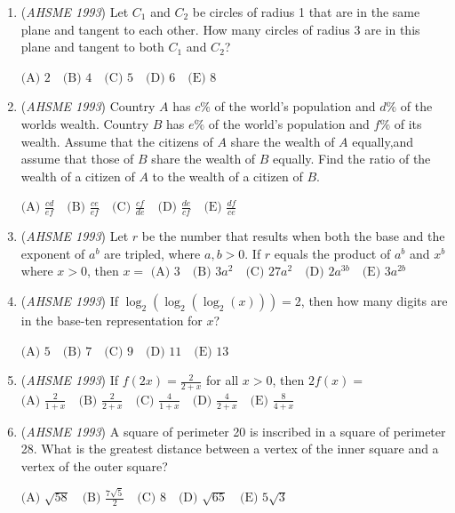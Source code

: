 \begin{enumerate}
 $\text{(A) } 10\quad \text{(B) } 11\quad \text{(C) } 12\quad \text{(D) } 13\quad \text{(E) } 15$


	\item (\textit{AHSME 1993}) Let $C_1$ and $C_2$ be circles of radius 1 that are in the same plane and tangent to each other. How many circles of radius 3 are in this plane and tangent to both $C_1$ and $C_2$?


 $\text{(A) } 2\quad \text{(B) } 4\quad \text{(C) } 5\quad \text{(D) } 6\quad \text{(E) } 8$


	\item (\textit{AHSME 1993}) Country $A$ has $c\%$ of the world's population and $d\%$ of the worlds wealth. Country $B$ has $e\%$ of the world's population and $f\%$ of its wealth. Assume that the citizens of $A$ share the wealth of $A$ equally,and assume that those of $B$ share the wealth of $B$ equally. Find the ratio of the wealth of a citizen of $A$ to the wealth of a citizen of $B$.


 $\text{(A) } \frac{cd}{ef}\quad \text{(B) } \frac{ce}{ef}\quad \text{(C) } \frac{cf}{de}\quad \text{(D) } \frac{de}{cf}\quad \text{(E) } \frac{df}{ce}$


	\item (\textit{AHSME 1993}) Let $r$ be the number that results when both the base and the exponent of $a^b$ are tripled, where $a,b>0$. If $r$ equals the product of $a^b$ and $x^b$ where $x>0$, then $x=$
$\text{(A) } 3\quad \text{(B) } 3a^2\quad \text{(C) } 27a^2\quad \text{(D) } 2a^{3b}\quad \text{(E) } 3a^{2b}$


	\item (\textit{AHSME 1993}) If $\log_2(\log_2(\log_2(x)))=2$, then how many digits are in the base-ten representation for $x$?


 $\text{(A) } 5\quad \text{(B) } 7\quad \text{(C) } 9\quad \text{(D) } 11\quad \text{(E) } 13$


	\item (\textit{AHSME 1993}) If $f(2x)=\frac{2}{2+x}$ for all $x>0$, then $2f(x)=$
$\text{(A) } \frac{2}{1+x}\quad \text{(B) } \frac{2}{2+x}\quad \text{(C) } \frac{4}{1+x}\quad \text{(D) } \frac{4}{2+x}\quad \text{(E) } \frac{8}{4+x}$


	\item (\textit{AHSME 1993}) A square of perimeter 20 is inscribed in a square of perimeter 28. What is the greatest distance between a vertex of the inner square and a vertex of the outer square?


 $\text{(A) } \sqrt{58}\quad \text{(B) } \frac{7\sqrt{5}}{2}\quad \text{(C) } 8\quad \text{(D) } \sqrt{65}\quad \text{(E) } 5\sqrt{3}$



\end{enumerate}
